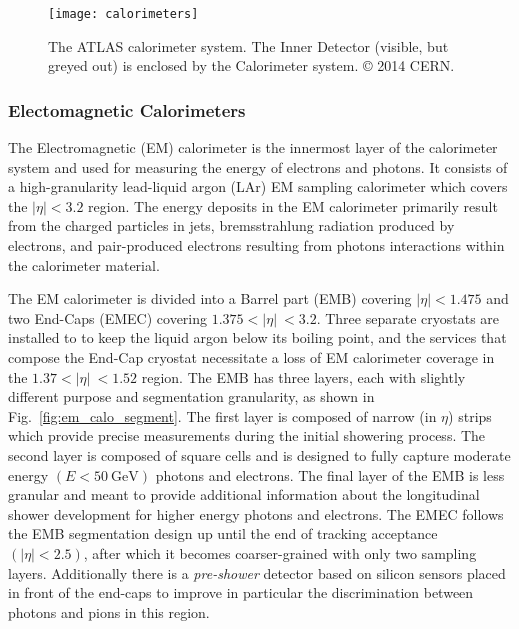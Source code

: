 \begin{figure}
	\centering
	\texttt{[image: calorimeters]}
	\caption{The ATLAS calorimeter system. The Inner Detector (visible, but greyed out) is enclosed by the Calorimeter system. © 2014 CERN.}
	\label{fig:calorimeter}
\end{figure}

\subsubsection{Electomagnetic Calorimeters}
The Electromagnetic (EM) calorimeter is the innermost layer of the calorimeter system and used for measuring the energy of electrons and photons.
It consists of a high-granularity lead-liquid argon (LAr) EM sampling calorimeter which covers the $|\eta| < 3.2$ region.
The energy deposits in the EM calorimeter primarily result from the charged particles in jets, bremsstrahlung radiation produced by electrons, and pair-produced electrons resulting from photons interactions within the calorimeter material.

The EM calorimeter is divided into a Barrel part (EMB) covering $|\eta| < 1.475$ and two End-Caps (EMEC) covering $1.375 < |\eta|\ < 3.2$.
Three separate cryostats are installed to to keep the liquid argon below its boiling point, and the services that compose the End-Cap cryostat necessitate a loss of EM calorimeter coverage in the $1.37 < |\eta|\ < 1.52$ region.
The EMB has three layers, each with slightly different purpose and segmentation granularity, as shown in Fig.~\ref{fig:em_calo_segment}.
The first layer is composed of narrow (in $\eta$) strips which provide precise measurements during the initial showering process.
The second layer is composed of square cells and is designed to fully capture moderate energy $(E < 50 \ \mathrm{GeV})$ photons and electrons.
The final layer of the EMB is less granular and meant to provide additional information about the longitudinal shower development for higher energy photons and electrons.
The EMEC follows the EMB segmentation design up until the end of tracking acceptance $(|\eta| < 2.5)$, after which it becomes coarser-grained with only two sampling layers.
Additionally there is a \textit{pre-shower} detector based on silicon sensors placed in front of the end-caps to improve in particular the discrimination between photons and pions in this region.

